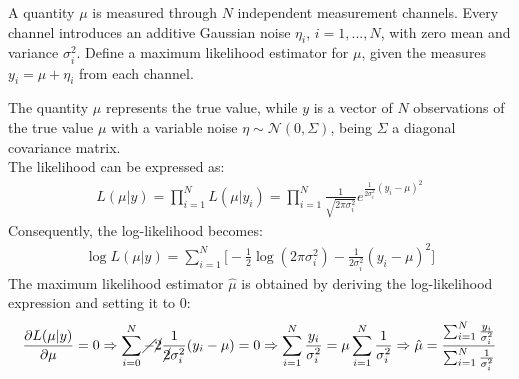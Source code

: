 \Exercise[number={12}]
A quantity \(\mu\) is measured through \(N\) independent measurement channels.
Every channel introduces an additive Gaussian noise \(\eta_i\), \(i=1,...,N\),
with zero mean and variance \(\sigma_i^2\). Define a maximum likelihood
estimator for \(\mu\), given the measures \(y_i = \mu + \eta_i\) from each
channel.

\Answer[number={12}]
The quantity \(\mu\) represents the true value, while \(y\) is a vector of
\(N\) observations of the true value \(\mu\) with a variable noise
\(\eta\sim\mathcal{N}(0, \Sigma)\), being \(\Sigma\) a diagonal covariance
matrix.\\
The likelihood can be expressed as:
\begin{align*}
    L(\mu|y)=\prod_{i=1}^{N}L(\mu|y_i)=\prod_{i=1}^{N}\frac{1}{\sqrt{2\pi\sigma_i^2}}e^{\frac{1}{2\sigma_i^2}(y_i-\mu)^2}
\end{align*}
Consequently, the log-likelihood becomes:
\begin{align*}
    \log{L(\mu|y)}
    =
    \sum_{i=1}^{N}\biggl[-\frac{1}{2}\log{(2\pi\sigma_i^2)}-\frac{1}{2\sigma_i^2}(y_i-\mu)^2\biggr]
\end{align*}
The maximum likelihood estimator \(\hat{\mu}\) is obtained by deriving the
log-likelihood expression and setting it to 0:
\begin{align*}
    \frac{\partial{L(\mu|y)}}{\partial{\mu}}=0
    \Rightarrow
    \sum_{i=0}^{N}\cancel{-}\cancel{2}\frac{1}{\cancel{2}\sigma_i^2}(y_i-\mu)=0
    \Rightarrow
    \sum_{i=1}^{N}\frac{y_i}{\sigma_i^2}=\mu\sum_{i=1}^{N}\frac{1}{\sigma_i^2}
    \Rightarrow
    \hat{\mu}=\frac{\sum_{i=1}^{N}\frac{y_i}{\sigma_i^2}}{\sum_{i=1}^{N}\frac{1}{\sigma_i^2}}
\end{align*}
